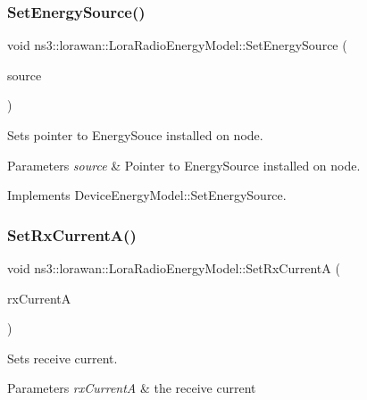 \subsubsection{\texorpdfstring{Set\+Energy\+Source()}{SetEnergySource()}}
{\footnotesize\ttfamily void ns3\+::lorawan\+::\+Lora\+Radio\+Energy\+Model\+::\+Set\+Energy\+Source (\begin{DoxyParamCaption}\item[{Ptr$<$ Energy\+Source $>$}]{source }\end{DoxyParamCaption})}



Sets pointer to Energy\+Souce installed on node. 


\begin{DoxyParams}{Parameters}
{\em source} & Pointer to Energy\+Source installed on node.\\
\hline
\end{DoxyParams}
Implements Device\+Energy\+Model\+::\+Set\+Energy\+Source. \mbox{\label{classns3_1_1lorawan_1_1LoraRadioEnergyModel_ab88d08184a9ac29d243527b936d87d7d}} 
\subsubsection{\texorpdfstring{Set\+Rx\+Current\+A()}{SetRxCurrentA()}}
{\footnotesize\ttfamily void ns3\+::lorawan\+::\+Lora\+Radio\+Energy\+Model\+::\+Set\+Rx\+CurrentA (\begin{DoxyParamCaption}\item[{double}]{rx\+CurrentA }\end{DoxyParamCaption})}



Sets receive current. 


\begin{DoxyParams}{Parameters}
{\em rx\+CurrentA} & the receive current \\
\hline
\end{DoxyParams}
\mbox{\label{classns3_1_1lorawan_1_1LoraRadioEnergyModel_aad4d63790bb240462087aca4f316d439}} 
